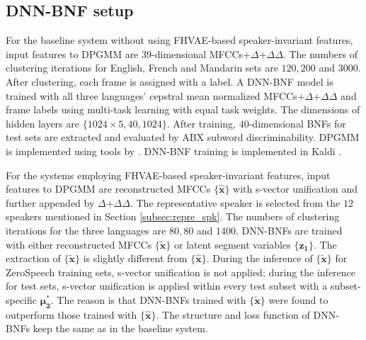 \documentclass[a4paper]{article}
\begin{document}
\subsection{DNN-BNF setup}
For the baseline system without using FHVAE-based speaker-invariant features,  input features  to DPGMM are  $39$-dimensional MFCCs+$\Delta$+$\Delta\Delta$. 
The numbers of clustering iterations for English, French and Mandarin sets are $120,200$ and $3000$. After clustering, each frame is assigned with a label. A DNN-BNF model is trained with all three languages'  cepstral mean normalized MFCCs+$\Delta$+$\Delta\Delta$ and frame labels using  multi-task learning with equal task weights. 
The dimensions of hidden layers are $\{1024\times5,40,1024\}$.
After training, $40$-dimensional BNFs for test sets are extracted and evaluated by ABX subword discriminability. DPGMM is implemented using tools by \cite{chang2013parallel}. DNN-BNF training is implemented in Kaldi \cite{povey2011kaldi}.

For the systems employing FHVAE-based speaker-invariant features,  input features to DPGMM are reconstructed MFCCs $\{\bm{\hat{x}}\}$ with s-vector unification and further appended by $\Delta$+$\Delta\Delta$. 
The representative speaker is selected from the $12$ speakers mentioned in Section \ref{subsec:repre_spk}. 
The numbers of clustering iterations for the three languages are $80,80$ and $1400$. 
DNN-BNFs are trained with either reconstructed MFCCs $\{\bm{\tilde{x}}\}$ or latent segment variables $\{\bm{z_1}\}$. The extraction of $\{\bm{\tilde{x}}\}$  is slightly different from $\{\bm{\hat{x}}\}$. During the  inference of $\{\bm{\tilde{x}}\}$ for ZeroSpeech training sets, s-vector unification is not applied;  during the inference for  test sets, s-vector unification is applied within every test subset with a subset-specific $\bm{\mu_2^*}$. 
The reason is that  DNN-BNFs  trained with $\{\bm{\tilde{x}}\}$ were found to outperform those trained with $\{\bm{\hat{x}}\}$.
The structure and loss function of DNN-BNFs keep the same as in the baseline system.
\end{document}
